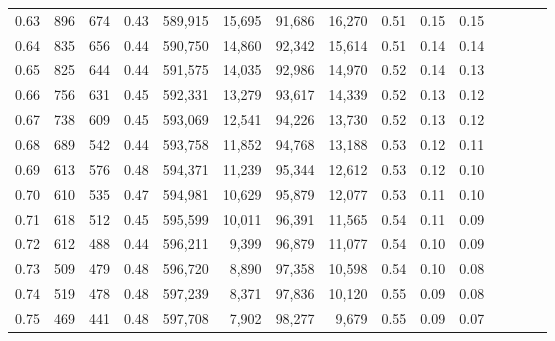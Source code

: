 \begin{tabular}{rrrcrrrrrrrrrrr}
0.63 &     896 &    674 &                                       0.43 &  589,915 &   15,695 &   91,686 &   16,270 &  0.51 &  0.15 &                         0.15 \\
0.64 &     835 &    656 &                                       0.44 &  590,750 &   14,860 &   92,342 &   15,614 &  0.51 &  0.14 &                         0.14 \\
0.65 &     825 &    644 &                                       0.44 &  591,575 &   14,035 &   92,986 &   14,970 &  0.52 &  0.14 &                         0.13 \\
0.66 &     756 &    631 &                                       0.45 &  592,331 &   13,279 &   93,617 &   14,339 &  0.52 &  0.13 &                         0.12 \\
0.67 &     738 &    609 &                                       0.45 &  593,069 &   12,541 &   94,226 &   13,730 &  0.52 &  0.13 &                         0.12 \\
0.68 &     689 &    542 &                                       0.44 &  593,758 &   11,852 &   94,768 &   13,188 &  0.53 &  0.12 &                         0.11 \\
0.69 &     613 &    576 &                                       0.48 &  594,371 &   11,239 &   95,344 &   12,612 &  0.53 &  0.12 &                         0.10 \\
0.70 &     610 &    535 &                                       0.47 &  594,981 &   10,629 &   95,879 &   12,077 &  0.53 &  0.11 &                         0.10 \\
0.71 &     618 &    512 &                                       0.45 &  595,599 &   10,011 &   96,391 &   11,565 &  0.54 &  0.11 &                         0.09 \\
0.72 &     612 &    488 &                                       0.44 &  596,211 &    9,399 &   96,879 &   11,077 &  0.54 &  0.10 &                         0.09 \\
0.73 &     509 &    479 &                                       0.48 &  596,720 &    8,890 &   97,358 &   10,598 &  0.54 &  0.10 &                         0.08 \\
0.74 &     519 &    478 &                                       0.48 &  597,239 &    8,371 &   97,836 &   10,120 &  0.55 &  0.09 &                         0.08 \\
0.75 &     469 &    441 &                                       0.48 &  597,708 &    7,902 &   98,277 &    9,679 &  0.55 &  0.09 &                         0.07 \\

\end{tabular}
